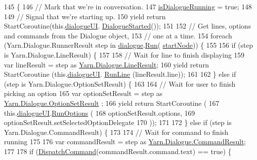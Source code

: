 \begin{DoxyCode}
145         \{
146             \textcolor{comment}{// Mark that we're in conversation.}
147             \hyperlink{a00037_a9eb0fd7b600a4667595042832af1d655}{isDialogueRunning} = \textcolor{keyword}{true};
148 
149             \textcolor{comment}{// Signal that we're starting up.}
150             yield \textcolor{keywordflow}{return} StartCoroutine(this.\hyperlink{a00037_ac87fdc65b0be57868f80c0fcd62ffd6d}{dialogueUI}.
      \hyperlink{a00038_af9d88ca81ac536d43046ca6572e3ff54}{DialogueStarted}());
151 
152             \textcolor{comment}{// Get lines, options and commands from the Dialogue object,}
153             \textcolor{comment}{// one at a time.}
154             \textcolor{keywordflow}{foreach} (Yarn.Dialogue.RunnerResult step in \hyperlink{a00037_a4f9712a847ca6d53ec8d2dd64dfcffd8}{dialogue}.\hyperlink{a00036_aead84ee50cb113ca45724894290ce9c2}{Run}(
      \hyperlink{a00037_a61c92b8d2228d01d8ac123b73bbb41a0}{startNode})) \{
155 
156                 \textcolor{keywordflow}{if} (step is Yarn.Dialogue.LineResult) \{
157 
158                     \textcolor{comment}{// Wait for line to finish displaying}
159                     var lineResult = step as \hyperlink{a00050}{Yarn.Dialogue.LineResult};
160                     yield \textcolor{keywordflow}{return} StartCoroutine (this.\hyperlink{a00037_ac87fdc65b0be57868f80c0fcd62ffd6d}{dialogueUI}.
      \hyperlink{a00038_a754c6dd0bc67895d11f878fe4477d698}{RunLine} (lineResult.line));
161 
162                 \} \textcolor{keywordflow}{else} \textcolor{keywordflow}{if} (step is Yarn.Dialogue.OptionSetResult) \{
163 
164                     \textcolor{comment}{// Wait for user to finish picking an option}
165                     var optionSetResult = step as \hyperlink{a00060}{Yarn.Dialogue.OptionSetResult}
      ;
166                     yield \textcolor{keywordflow}{return} StartCoroutine (
167                         this.\hyperlink{a00037_ac87fdc65b0be57868f80c0fcd62ffd6d}{dialogueUI}.\hyperlink{a00038_ac5b29079f638f2ceb078627ef1e60004}{RunOptions} (
168                         optionSetResult.options,
169                         optionSetResult.setSelectedOptionDelegate
170                     ));
171 
172                 \} \textcolor{keywordflow}{else} \textcolor{keywordflow}{if} (step is Yarn.Dialogue.CommandResult) \{
173 
174                     \textcolor{comment}{// Wait for command to finish running}
175 
176                     var commandResult = step as \hyperlink{a00027}{Yarn.Dialogue.CommandResult};
177 
178                     \textcolor{keywordflow}{if} (\hyperlink{a00037_a7b200f8ddcf77f50906a6341aadeb671}{DispatchCommand}(commandResult.command.text) == \textcolor{keyword}{true}) \{

\end{DoxyCode}
